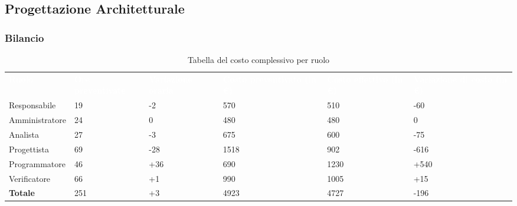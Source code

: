 \subsection{Progettazione Architetturale}
\subsubsection{Bilancio}

{
\renewcommand{\arraystretch}{2}
\begin{longtable}[h]{ C{2.5cm} C{2.5cm} C{2.5cm} C{2.5cm} C{1.5cm} C{2.5cm}}
\caption{Tabella del costo complessivo per ruolo}\\

\textcolor{white}{\textbf{Ruolo}} & 
\textcolor{white}{\textbf{Ore preventivate}} & 
\textcolor{white}{\textbf{Variazione oraria}} & 
\textcolor{white}{\textbf{Costo preventivato (in \euro{})}} & 
\textcolor{white}{\textbf{Costo effettivo (in \euro{})}} & 
\textcolor{white}{\textbf{Variazione di costo (in \euro{})}}\\	
	
Responsabile    &  19 &  -2 &  570 &  510 &  -60 \\
Amministratore  &  24 &   0 &  480 &  480 &    0 \\
Analista        &  27 &  -3 &  675 &  600 &  -75 \\
Progettista     &  69 & -28 & 1518 &  902 & -616 \\
Programmatore   &  46 & +36 &  690 & 1230 & +540 \\
Verificatore    &  66 &  +1 &  990 & 1005 &  +15 \\
\textbf{Totale} & 251 &  +3 & 4923 & 4727 & -196 \\	

\end{longtable}
}

